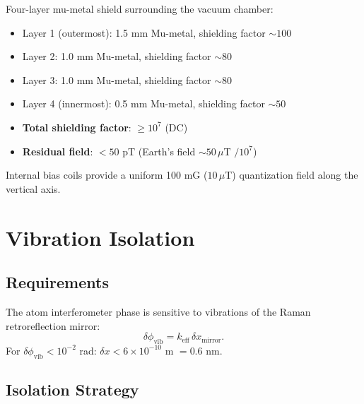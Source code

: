 \documentclass[12pt,a4paper]{article}
\begin{document}
Four-layer mu-metal shield surrounding the vacuum chamber:
\begin{itemize}
\item Layer 1 (outermost): 1.5 mm Mu-metal, shielding factor $\sim 100$
\item Layer 2: 1.0 mm Mu-metal, shielding factor $\sim 80$
\item Layer 3: 1.0 mm Mu-metal, shielding factor $\sim 80$
\item Layer 4 (innermost): 0.5 mm Mu-metal, shielding factor $\sim 50$
\item \textbf{Total shielding factor}: $\geq 10^7$ (DC)
\item \textbf{Residual field}: $< 50$ pT (Earth's field $\sim 50\,\mu$T
$/10^7$)
\end{itemize}

Internal bias coils provide a uniform 100 mG ($10\,\mu$T) quantization
field along the vertical axis.


\section{Vibration Isolation}\label{sec:vibration}

\subsection{Requirements}

The atom interferometer phase is sensitive to vibrations of the Raman
retroreflection mirror:
\begin{equation}
\delta\phi_{\text{vib}} = k_{\text{eff}}\,\delta x_{\text{mirror}}.
\end{equation}
For $\delta\phi_{\text{vib}} < 10^{-2}$ rad:
$\delta x < 6 \times 10^{-10}$ m $= 0.6$ nm.

\subsection{Isolation Strategy}
\end{document}
